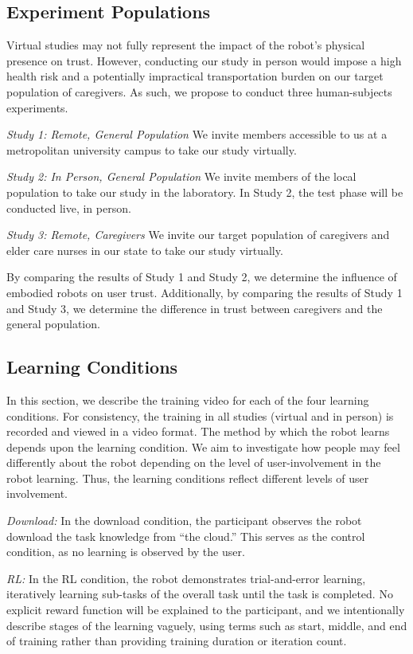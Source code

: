\documentclass[letterpaper]{article} %
\begin{document}
\subsection{Experiment Populations} \label{sec:humanexperiment}
Virtual studies may not fully represent the impact of the robot's physical presence on trust. However, conducting our study in person would impose a high health risk and a potentially impractical transportation burden on our target population of caregivers. As such, we propose to conduct three human-subjects experiments.

\indent \textit{Study 1: Remote, General Population} We invite members accessible to us at a metropolitan university campus to take our study virtually. 

\indent \textit{Study 2: In Person, General Population} We invite members of the local population to take our study in the laboratory. In Study 2, the test phase will be conducted live, in person.

\indent \textit{Study 3: Remote, Caregivers} We invite our target population of caregivers and elder care nurses in our state to take our study virtually.

By comparing the results of Study 1 and Study 2, we determine the influence of embodied robots on user trust. Additionally, by comparing the results of Study 1 and Study 3, we determine the difference in trust between caregivers and the general population.

\subsection{Learning Conditions} 
\label{sec:conditions}
In this section, we describe the training video for each of the four learning conditions. For consistency, the training in all studies (virtual and in person) is recorded and viewed in a video format. The method by which the robot learns depends upon the learning condition. We aim to investigate how people may feel differently about the robot depending on the level of user-involvement in the robot learning. Thus, the learning conditions reflect different levels of user involvement.

\textit{Download: }In the download condition, the participant observes the robot download the task knowledge from ``the cloud.'' This serves as the control condition, as no learning is observed by the user. 

\textit{RL: }In the RL condition, the robot demonstrates trial-and-error learning, iteratively learning sub-tasks of the overall task until the task is completed. No explicit reward function will be explained to the participant, and we intentionally describe stages of the learning vaguely, using terms such as start, middle, and end of training rather than providing training duration or iteration count.
\end{document}
